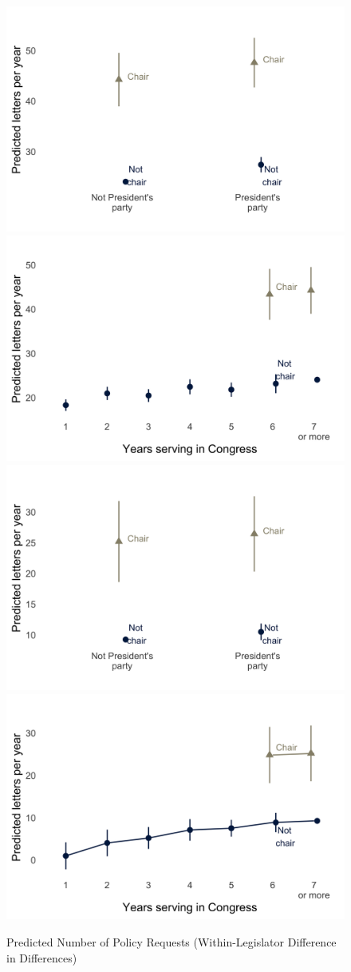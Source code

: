 \documentclass[12pt]{article}
\begin{document}
\begin{figure}[hbt!]
\centering
\caption{Predicted Number of Policy Requests (Within-Legislator Difference in Differences)} \label{f:m-policy-predicted}
\includegraphics[width = .48\textwidth]{figs/m-policy-predicted-1} 
\includegraphics[width = .48\textwidth]{figs/m-policy-predicted-2} 
\includegraphics[width = .48\textwidth]{figs/m-policy-predicted-3} 
\includegraphics[width = .48\textwidth]{figs/m-policy-predicted-4} 

\end{figure}
\end{document}
